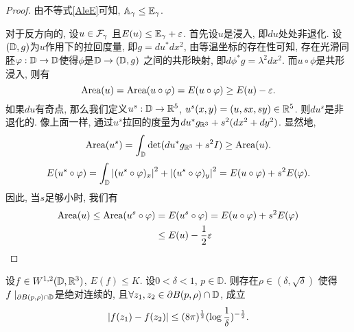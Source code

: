 \begin{proof}
    由不等式\eqref{AleE}可知, ${\mathbb{A}_\gamma} \le {\mathbb{E}_\gamma}$.
    \par 对于反方向的, 设$u\in {\mathcal{F}_\gamma}$ 且${E}(u) \le {\mathbb{E}_\gamma} + \varepsilon$. 首先设$u$是浸入, 即$du$处处非退化. 设$({\mathbb{D}},g)$为$u$作用下的拉回度量, 即$g=du^*dx^2$, 由等温坐标的存在性可知, 存在光滑同胚$\varphi: {\mathbb{D}} \to {\mathbb{D}}$使得$\phi$是$\mathbb{D} \to ({\mathbb{D}},g)$ 之间的共形映射, 即$d\phi ^* g=\lambda^2dx^2$. 而$u\circ \phi$是共形浸入, 则有
    \begin{equation}
        \text{Area}(u)=\text{Area}(u\circ \varphi)={E}(u\circ \varphi) \ge {E}(u)-\varepsilon.
    \end{equation}
    如果$du$有奇点, 那么我们定义$u^s: {\mathbb{D}} \to \mathbb{R}^5$, $u^s(x,y)=(u,sx,sy)\in \mathbb{R}^5$. 则$du^s$是非退化的. 像上面一样, 通过$u^s$拉回的度量为$du^*g_{\mathbb{R}^3}+s^2(dx^2+dy^2)$. 显然地, 
    \begin{equation}
        \text{Area}(u^s)=\int_{\mathbb{D}} \det (du^*g_{\mathbb{R}^3}+s^2I) \ge \text{Area}(u).
    \end{equation}
    \begin{equation}
        {E}(u^s\circ\varphi)=\int_{\mathbb{D}} \left | (u^s\circ \varphi)_x \right |^2+ \left | (u^s\circ \varphi)_y \right |^2 ={E}(u\circ \varphi)+s^2{E}(\varphi).
    \end{equation}
    因此, 当$s$足够小时, 我们有
    \begin{equation}
        \begin{split}
            \text{Area}(u) \le \text{Area}(u^s\circ \varphi) &= {E}(u^s\circ \varphi) ={E}(u\circ \varphi) +s^2{E}(\varphi) \\
            &\le {E}(u)-\frac{1}{2}\varepsilon
        \end{split}
    \end{equation}
\end{proof}
\begin{lemma}
    设$f \in W^{1,2}({\mathbb{D}},\mathbb{R}^3)$, $E(f) \le K$. 设$0 < \delta < 1$, $p \in \mathbb{D}$. 则存在$\rho \in (\delta, \sqrt{\delta})$ 使得$f\mid_{{\partial} B(p,\rho) \cap {\mathbb{D}}}$是绝对连续的, 且$\forall z_1,z_2 \in {\partial} B(p,\rho) \cap {\mathbb{D}}$, 成立 
    \begin{equation}
        \left | f(z_1)- f(z_2) \right | \le (8\pi)^{\frac{1}{2}}(\log \frac{1}{\delta})^{-\frac{1}{2}}.
    \end{equation}
\end{lemma}
